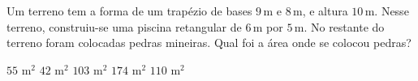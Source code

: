 \noindent\parbox{\linewidth}{

Um terreno tem a forma de um trapézio de bases $9$\,m e $8$\,m, e altura $10$\,m. Nesse terreno, construiu-se uma piscina retangular de $6$\,m por $5$\,m. No restante do terreno foram colocadas pedras mineiras. Qual foi a área onde se colocou pedras?

$55$ m$^2$
$42$ m$^2$
$103$ m$^2$
$174$ m$^2$
$110$ m$^2$



}


